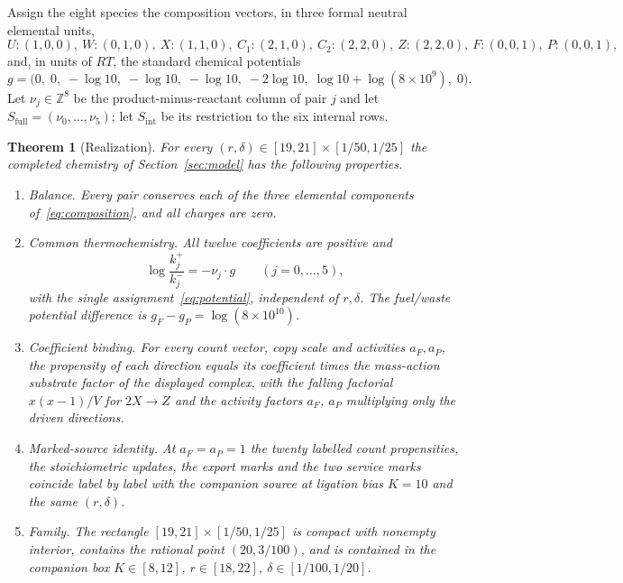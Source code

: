 \documentclass[11pt,a4paper]{article}
\theoremstyle{plain}
\newtheorem{theorem}{Theorem}[section]
\theoremstyle{definition}
\theoremstyle{remark}
\newcommand{\Z}{\mathbb Z}
\newcommand{\Sint}{S_{\mathrm{int}}}
\newcommand{\Sfull}{S_{\mathrm{full}}}
\begin{document}
Assign the eight species the composition vectors, in three formal neutral elemental units,
\begin{equation}\label{eq:composition}
 U{:}(1,0,0),\ W{:}(0,1,0),\ X{:}(1,1,0),\ C_1{:}(2,1,0),\ C_2{:}(2,2,0),\ Z{:}(2,2,0),\ F{:}(0,0,1),\ P{:}(0,0,1),
\end{equation}
and, in units of $RT$, the standard chemical potentials
\begin{equation}\label{eq:potential}
 g=\big(0,\;0,\;-\log10,\;-\log10,\;-\log10,\;-2\log10,\;\log10+\log(8\times10^{9}),\;0\big).
\end{equation}
Let $\nu_j\in\Z^8$ be the product-minus-reactant column of pair $j$ and let $\Sfull=(\nu_0,\dots,\nu_5)$; let $\Sint$ be its restriction to the six internal rows.

\begin{theorem}[Realization]\label{thm:realization}
For every $(r,\delta)\in[19,21]\times[1/50,1/25]$ the completed chemistry of Section~\ref{sec:model} has the following properties.
\begin{enumerate}[label=(\alph*)]
\item \emph{Balance.} Every pair conserves each of the three elemental components of~\eqref{eq:composition}, and all charges are zero.
\item \emph{Common thermochemistry.} All twelve coefficients are positive and
\begin{equation}\label{eq:thermo}
 \log\frac{k_j^+}{k_j^-}=-\nu_j\cdot g\qquad(j=0,\dots,5),
\end{equation}
with the single assignment~\eqref{eq:potential}, independent of $r,\delta$. The fuel/waste potential difference is $g_F-g_P=\log(8\times10^{10})$.
\item \emph{Coefficient binding.} For every count vector, copy scale and activities $a_F,a_P$, the propensity of each direction equals its coefficient times the mass-action substrate factor of the displayed complex, with the falling factorial $x(x-1)/V$ for $2X\to Z$ and the activity factors $a_F$, $a_P$ multiplying only the driven directions.
\item \emph{Marked-source identity.} At $a_F=a_P=1$ the twenty labelled count propensities, the stoichiometric updates, the export marks and the two service marks coincide label by label with the companion source at ligation bias $K=10$ and the same $(r,\delta)$.
\item \emph{Family.} The rectangle $[19,21]\times[1/50,1/25]$ is compact with nonempty interior, contains the rational point $(20,3/100)$, and is contained in the companion box $K\in[8,12]$, $r\in[18,22]$, $\delta\in[1/100,1/20]$.
\end{enumerate}
\end{theorem}
\end{document}
